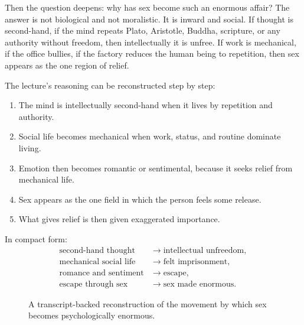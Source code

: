 Then the question deepens: why has sex become such an enormous affair? The answer is not biological and not moralistic. It is inward and social. If thought is second-hand, if the mind repeats Plato, Aristotle, Buddha, scripture, or any authority without freedom, then intellectually it is unfree. If work is mechanical, if the office bullies, if the factory reduces the human being to repetition, then sex appears as the one region of relief.

The lecture's reasoning can be reconstructed step by step:
\begin{enumerate}
\item The mind is intellectually second-hand when it lives by repetition and authority.
\item Social life becomes mechanical when work, status, and routine dominate living.
\item Emotion then becomes romantic or sentimental, because it seeks relief from mechanical life.
\item Sex appears as the one field in which the person feels some release.
\item What gives relief is then given exaggerated importance.
\end{enumerate}

In compact form:
\begin{align}
\text{second-hand thought} &\longrightarrow \text{intellectual unfreedom},\\
\text{mechanical social life} &\longrightarrow \text{felt imprisonment},\\
\text{romance and sentiment} &\longrightarrow \text{escape},\\
\text{escape through sex} &\longrightarrow \text{sex made enormous}.
\end{align}

\begin{figure}
\centering
{}
\caption{A transcript-backed reconstruction of the movement by which sex becomes psychologically enormous.}
\end{figure}

